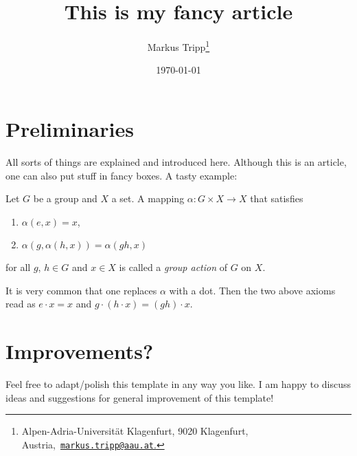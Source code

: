 \documentclass[numbers=endperiod]{scrartcl}
\begin{document}
\title{This is my fancy article}
\author{Markus Tripp\thanks{Alpen-Adria-Universität Klagenfurt, 9020 Klagenfurt, Austria,~\href{mailto:markus.tripp@aau.at}{\texttt{markus.tripp@aau.at}.}}}	
\date{\today}

\maketitle
{}
\keywords{}

\section{Preliminaries}
All sorts of things are explained and introduced here. Although this is an article, one can also put stuff in fancy boxes. A tasty example:

\begin{definition}
	Let $G$ be a group and $X$ a set. A mapping $\alpha:G\times X \to X$ that satisfies
	\begin{enumerate}[label=(A\arabic*)]
		\item $\alpha(e,x) = x$,
		\item $\alpha(g,\alpha(h,x))=\alpha(gh,x)$
	\end{enumerate}
	for all $g$, $h \in G$ and $x \in X$ is called a \emph{group action} of $G$ on $X$.
\end{definition}

\begin{remark}
	It is very common that one replaces $\alpha$ with a dot. Then the two above axioms read as $e\cdot x = x$ and $g\cdot (h \cdot x) = (gh) \cdot x$.
\end{remark}

\section{Improvements?}
Feel free to adapt/polish this template in any way you like. I am happy to discuss ideas and suggestions for general improvement of this template!

\printbibliography
\end{document}
